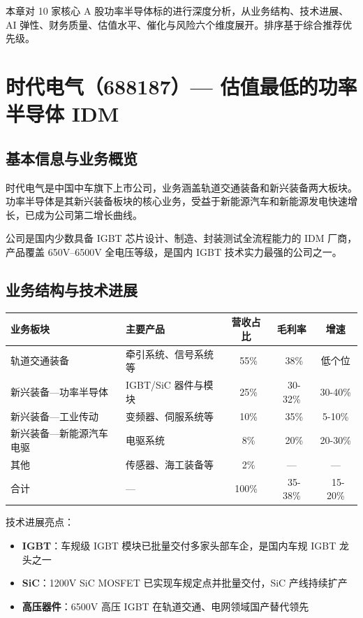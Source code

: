 
本章对 10 家核心 A 股功率半导体标的进行深度分析，从业务结构、技术进展、AI 弹性、财务质量、估值水平、催化与风险六个维度展开。排序基于综合推荐优先级。

\section{时代电气（688187）— 估值最低的功率半导体 IDM}

\subsection{基本信息与业务概览}

时代电气是中国中车旗下上市公司，业务涵盖轨道交通装备和新兴装备两大板块。功率半导体是其新兴装备板块的核心业务，受益于新能源汽车和新能源发电快速增长，已成为公司第二增长曲线。

公司是国内少数具备 IGBT 芯片设计、制造、封装测试全流程能力的 IDM 厂商，产品覆盖 650V–6500V 全电压等级，是国内 IGBT 技术实力最强的公司之一。

\subsection{业务结构与技术进展}

\begin{exhibitbox}[表 6-1：时代电气业务结构（2025E 估算）]
\centering
\small
\begin{tabularx}{\textwidth}{L{2.5cm} X c c c}
\toprule
\textbf{业务板块} & \textbf{主要产品} & \textbf{营收占比} & \textbf{毛利率} & \textbf{增速} \\
\midrule
轨道交通装备 & 牵引系统、信号系统等 & ~55\% & ~38\% & 低个位 \\
新兴装备—功率半导体 & IGBT/SiC 器件与模块 & ~25\% & ~30-32\% & 30-40\% \\
新兴装备—工业传动 & 变频器、伺服系统等 & ~10\% & ~35\% & 5-10\% \\
新兴装备—新能源汽车电驱 & 电驱系统 & ~8\% & ~20\% & 20-30\% \\
其他 & 传感器、海工装备等 & ~2\% & — & — \\
\midrule
合计 & — & 100\% & ~35-38\% & ~15-20\% \\
\bottomrule
\end{tabularx}
\end{exhibitbox}

技术进展亮点：
\begin{itemize}[leftmargin=2em]
\item \textbf{IGBT}：车规级 IGBT 模块已批量交付多家头部车企，是国内车规 IGBT 龙头之一
\item \textbf{SiC}：1200V SiC MOSFET 已实现车规定点并批量交付，SiC 产线持续扩产
\item \textbf{高压器件}：6500V 高压 IGBT 在轨道交通、电网领域国产替代领先
\end{itemize}

